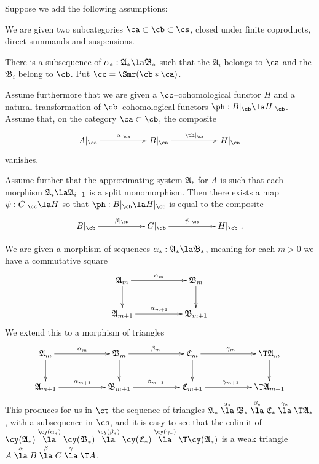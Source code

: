 \documentclass[11pt]{amsart}
\begin{document}
Suppose we add the following assumptions:
\be
\setcounter{enumi}{\value{enumiv}}
\item
We are given
two subcategories $\ca\subset\cb\subset\cs$, closed under
finite coproducts, direct summands and
suspensions.
\item
There is a subsequence of $\alpha_*:\mathfrak{A}_*\la\mathfrak{B}_*$
such that the $\mathfrak{A}_i$ belongs to $\ca$ and the
$\mathfrak{B}_i$ belong
to $\cb$. Put $\cc=\Smr(\cb*\ca)$.
\item
Assume furthermore that we are given a $\cc$--cohomological
functor $H$ and a natural
transformation  of $\cb$--cohomological
functors $\ph: B|_\cb\la H|_\cb$. Assume that, on the category
$\ca\subset\cb$, the composite
\[\xymatrix@C+30pt{
A|_\ca\ar[r]^-{\alpha|_\ca} & B|_\ca\ar[r]^-{\ph|_\ca} & H|_\ca
}\]
vanishes.
\item
Assume further that the approximating system 
$\mathfrak{A}_*$ for $A$ is such that
each morphism $\mathfrak{A}_i\la \mathfrak{A}_{i+1}$
is a split monomorphism.
\setcounter{enumiv}{\value{enumi}}
\ee
Then there exists a map $\psi:C|_{\cc}\la H$
so that
$\ph:B|_\cb\la H|_\cb$ is equal to the composite
\[\xymatrix@C+30pt{
B|_\cb\ar[r]^-{\beta|_{\cb}} & C|_\cb\ar[r]^-{\psi|_\cb} & H|_\cb\ .
}\]
\elem

\prf
We are given a morphism of sequences $\alpha_*:\mathfrak{A}_*\la\mathfrak{B}_*$,
meaning for each $m>0$ we have a commutative square
\[\xymatrix@C+30pt{
  \mathfrak{A}_m\ar[r]^{\alpha_m}\ar[d] & \mathfrak{B}_m\ar[d] \\
  \mathfrak{A}_{m+1}\ar[r]^{\alpha_{m+1}} & \mathfrak{B}_{m+1}
}\]
We extend this to a morphism of triangles
\[\xymatrix@C+30pt{
  \mathfrak{A}_m\ar[r]^{\alpha_m}\ar[d] & \mathfrak{B}_m\ar[d]\ar[r]^{\beta_m}
    & \mathfrak{C}_m\ar[r]^{\gamma_m}\ar[d]&\T \mathfrak{A}_m\ar[d]\\
  \mathfrak{A}_{m+1}\ar[r]^{\alpha_{m+1}}& \mathfrak{B}_{m+1}\ar[r]^{\beta_{m+1}}&
  \mathfrak{C}_{m+1}\ar[r]^{\gamma_{m+1}} &\T \mathfrak{A}_{m+1}
}\]
This
produces for us in $\ct$ the sequence of
triangles
$\mathfrak{A}_*\stackrel{\alpha_*}\la\mathfrak{B}_*\stackrel{\beta_*}\la\mathfrak{C}_*\stackrel{\gamma_*}\la\T\mathfrak{A}_*$, with a subsequence in $\cs$,
and it is easy to see that the colimit
of
$\cy(\mathfrak{A}_*)\stackrel{\cy(\alpha_*)}\la\cy(\mathfrak{B}_*)\stackrel{\cy(\beta_*)}\la\cy(\mathfrak{C}_*)\stackrel{\cy(\gamma_*)}\la\T\cy(\mathfrak{A}_*)$
is a weak triangle 
$A\stackrel{\alpha}\la B\stackrel{\beta}\la C\stackrel{\gamma}\la \T A$.
\end{document}
